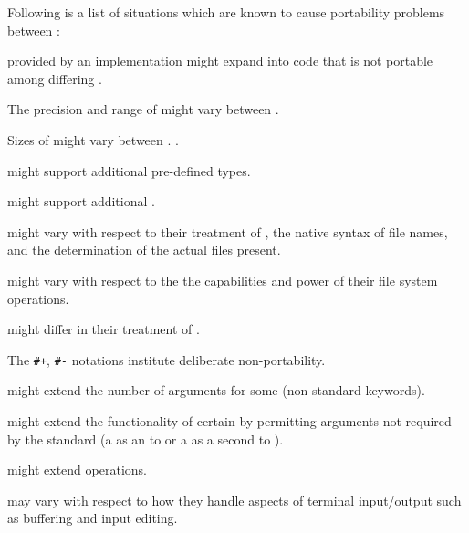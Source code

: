 
Following is a list of situations which are known to cause portability
problems between :

\beginlist                                           
\item{\bull}
   provided by an implementation might expand
  into code that is not portable among differing .
\item{\bull} 
  The precision and range of  might vary between .
\item{\bull}
  Sizes of  might vary between .
  \Seesection\ImplemDefFeatures.
\item{\bull}
   might support additional pre-defined  types.
\item{\bull}
   might support additional .
\item{\bull}
   might vary with respect to their treatment of
  , the native syntax of file names, 
  and the determination of the actual files present.
\item{\bull}
   might vary with respect to the the capabilities
  and power of their file system operations.
\item{\bull}
   might differ in their treatment of .
\item{\bull}
  The {\tt #+}, {\tt #-} notations institute deliberate non-portability.
\item{\bull} 
   might extend the number of arguments for some
   (\eg non-standard  keywords).
\item{\bull}
   might extend the functionality of certain 
  by permitting arguments not required by the standard 
  (\eg a  as an  to  
   or a  as a second  to ).
\item{\bull}
   might extend  operations.
\item{\bull} 
   may vary with respect to how they handle aspects of
  terminal input/output such as buffering and input editing.
\endlist
